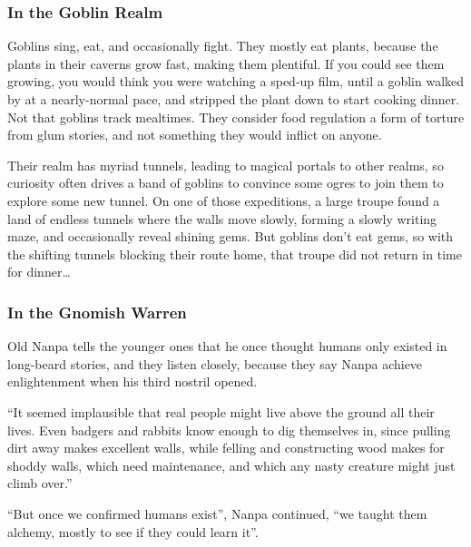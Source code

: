 \begin{multicols}{2}

\subsubsection{In the Goblin Realm}

\begin{exampletext}
  Goblins sing, eat, and occasionally fight.
  They mostly eat plants, because the plants in their caverns grow fast, making them plentiful.
  If you could see them growing, you would think you were watching a sped-up film, until a goblin walked by at a nearly-normal pace, and stripped the plant down to start cooking dinner.
  Not that goblins track mealtimes.
  They consider food regulation a form of torture from glum stories, and not something they would inflict on anyone.

  Their realm has myriad tunnels, leading to magical portals to other realms, so curiosity often drives a band of goblins to convince some ogres to join them to explore some new tunnel.
  On one of those expeditions, a large troupe found a land of endless tunnels where the walls move slowly, forming a slowly writing maze, and occasionally reveal shining gems.
  But goblins don't eat gems, so with the shifting tunnels blocking their route home, that troupe did not return in time for dinner\ldots
\end{exampletext}

\subsubsection{In the Gnomish Warren}

\begin{exampletext}
  Old Nanpa tells the younger ones that he once thought humans only existed in long-beard stories, and they listen closely, because they say Nanpa achieve enlightenment when his third nostril opened.

  ``It seemed implausible that real people might live above the ground all their lives.
  Even badgers and rabbits know enough to dig themselves in, since pulling dirt away makes excellent walls, while felling and constructing wood makes for shoddy walls, which need maintenance, and which any nasty creature might just climb over.''

  ``But once we confirmed humans exist'', Nanpa continued, ``we taught them alchemy, mostly to see if they could learn it''.


\end{exampletext}
\end{multicols}
